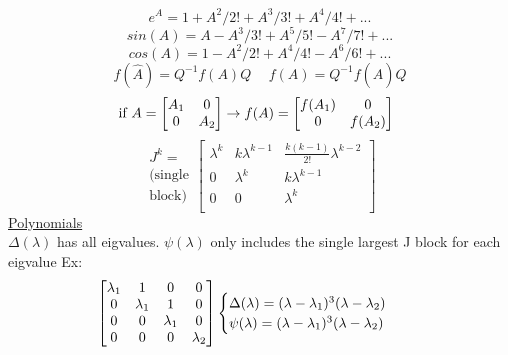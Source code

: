 \documentclass[twocolumn]{article}    %
\begin{document}
\begin{equation*}
    e^A = 1 + A^2/2! + A^3/3! + A^4/4! +...
\end{equation*}
\begin{equation*}
    sin(A) = A - A^3/3! +A^5/5! - A^7/7!+ ...
\end{equation*}
\begin{equation*}
    cos(A) = 1 - A^2/2! + A^4/4! - A^6/6! +... 
\end{equation*}
\begin{equation*}
    f(\hat{A}) = Q^{-1}f(A)Q \hspace{15pt} f(A) = Q^{-1}f(\hat{A})Q
\end{equation*}
\begin{equation*}
    \hspace{-5pt} \text{if } A = 
    \begin{bmatrix}
        A_1 & 0\\
        0& A_2
    \end{bmatrix}
    \rightarrow f(A) = 
    \begin{bmatrix}
        f(A_1) & 0\\
        0 & f(A_2)\\
    \end{bmatrix}
\end{equation*}
\begin{equation*}
    \begin{matrix}
        J^k = \\
        \text{(single}\\
        \text{block)}
    \end{matrix} 
    \begin{bmatrix}
        \lambda^k & k\lambda^{k-1} & \frac{k(k-1)}{2!} \lambda^{k-2}\\
        0 & \lambda^k & k\lambda^{k-1} \\
        0 & 0 & \lambda^k \\
    \end{bmatrix}
\end{equation*}
\noindent
\underline{Polynomials}\\
\(\Delta(\lambda)\) has all eigvalues. \(\psi (\lambda)\) only includes the single largest J block for each eigvalue  Ex:
\begin{equation*}
    \hspace{-15pt}
    \begin{bmatrix}
        \lambda_1 & 1 & 0 &0\\
        0 &  \lambda_1 & 1 & 0\\
        0 & 0 & \lambda_1 & 0\\
        0 & 0 & 0 & \lambda_2
    \end{bmatrix}  
    \begin{cases}
        \Delta(\lambda) = (\lambda-\lambda_1)^3(\lambda-\lambda_2)\\
        \psi (\lambda) = (\lambda-\lambda_1)^3(\lambda-\lambda_2)
    \end{cases}
\end{equation*}
\end{document}
